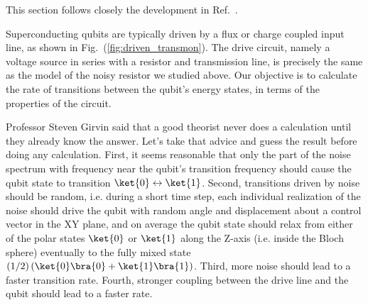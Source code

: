 
This section follows closely the development in Ref.~\cite{Sank:qubits101:2012}.

Superconducting qubits are typically driven by a flux or charge coupled input line, as shown in Fig.~(\ref{fig:driven_transmon}).
The drive circuit, namely a voltage source in series with a resistor and transmission line, is precisely the same as the model of the noisy resistor we studied above.
Our objective is to calculate the rate of transitions between the qubit's energy states, in terms of the properties of the circuit.


Professor Steven Girvin said that a good theorist never does a calculation until they already know the answer.
Let's take that advice and guess the result before doing any calculation.
First, it seems reasonable that only the part of the noise spectrum with frequency near the qubit's transition frequency should cause the qubit state to transition $\ket{0} \leftrightarrow \ket{1}$.
Second, transitions driven by noise should be random, i.e. during a short time step, each individual realization of the noise should drive the qubit with random angle and displacement about a control vector in the XY plane, and on average the qubit state should relax from either of the polar states $\ket{0}$ or $\ket{1}$ along the Z-axis (i.e. inside the Bloch sphere) eventually to the fully mixed state $(1/2)\left(\ket{0} \bra{0} + \ket{1} \bra{1} \right)$.
Third, more noise should lead to a faster transition rate.
Fourth, stronger coupling between the drive line and the qubit should lead to a faster rate.


